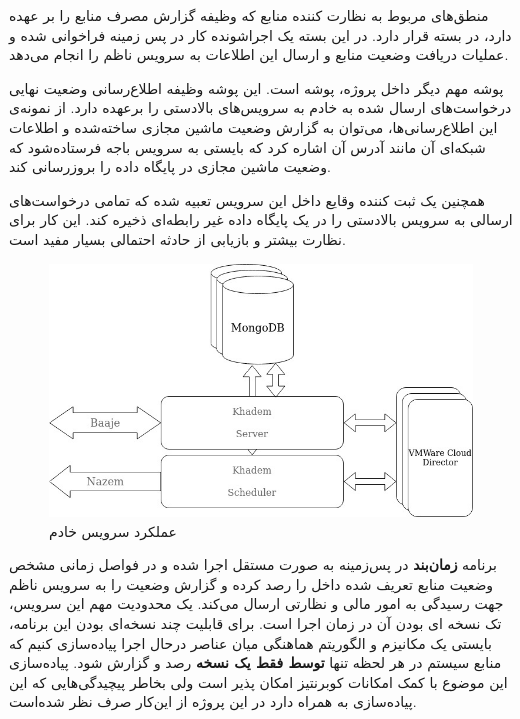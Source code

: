 منطق‌های مربوط به نظارت کننده منابع که وظیفه گزارش مصرف منابع‌ را بر عهده دارد، در بسته  قرار دارد. در این بسته یک اجراشونده کار در پس زمینه فراخوانی شده و عملیات دریافت وضعیت منابع و ارسال این اطلاعات به سرویس ناظم را انجام می‌دهد.

پوشه مهم دیگر داخل پروژه، پوشه  است. این پوشه وظیفه اطلاع‌رسانی وضعیت نهایی درخواست‌های ارسال شده به خادم  به سرویس‌های بالادستی را برعهده دارد. از نمونه‌ی این اطلاع‌رسانی‌ها، می‌توان به گزارش وضعیت ماشین مجازی ساخته‌شده و اطلاعات شبکه‌ای آن مانند آدرس  آن اشاره کرد که بایستی به سرویس باجه فرستاده‌شود که وضعیت ماشین مجازی در پایگاه داده را بروزرسانی کند.

همچنین یک ثبت کننده وقایع داخل این سرویس تعبیه شده که تمامی درخواست‌های ارسالی به سرویس‌ بالا‌دستی را در یک پایگاه داده غیر رابطه‌ای ذخیره کند. این کار برای نظارت بیشتر و بازیابی از حادثه احتمالی بسیار مفید است.

\begin{figure}
	\centering
	\includegraphics[scale=0.5]{figures/30bird-khadem.jpeg}
	\caption{عملکرد سرویس خادم}
	\label{fig:30bird-khadem}
\end{figure}

برنامه \textbf{زمان‌بند} در پس‌زمینه به صورت مستقل اجرا شده و در فواصل زمانی مشخص وضعیت منابع تعریف شده داخل  را رصد کرده و گزارش وضعیت را به سرویس ناظم جهت رسیدگی به امور مالی و نظارتی ارسال می‌کند. یک محدودیت مهم این سرویس، تک نسخه ای بودن آن در زمان اجرا است. برای قابلیت چند نسخه‌ای بودن این برنامه، بایستی یک مکانیزم و الگوریتم هماهنگی میان عناصر درحال اجرا پیاده‌سازی کنیم که منابع سیستم در هر لحظه تنها \textbf{توسط فقط یک نسخه} رصد و گزارش شود. پیاده‌سازی این موضوع با کمک امکانات کوبرنتیز امکان پذیر است ولی بخاطر پیچیدگی‌هایی که این پیاده‌سازی به همراه دارد در این پروژه از این‌کار صرف نظر شده‌است.

